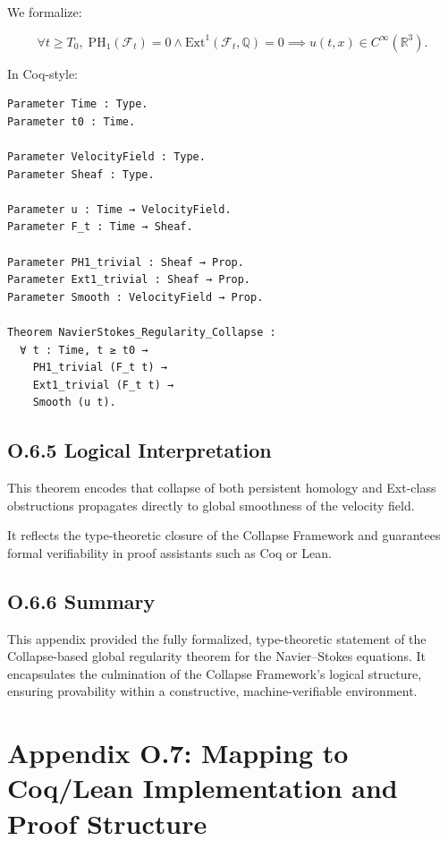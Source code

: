 \documentclass[11pt]{article}
\begin{document}
We formalize:

\[
\forall t \geq T_0,\;
\mathrm{PH}_1(\mathcal{F}_t) = 0 \land \mathrm{Ext}^1(\mathcal{F}_t, \mathbb{Q}) = 0
\implies u(t, x) \in C^\infty(\mathbb{R}^3).
\]

In Coq-style:

\begin{lstlisting}[language=Coq]
Parameter Time : Type.
Parameter t0 : Time.

Parameter VelocityField : Type.
Parameter Sheaf : Type.

Parameter u : Time → VelocityField.
Parameter F_t : Time → Sheaf.

Parameter PH1_trivial : Sheaf → Prop.
Parameter Ext1_trivial : Sheaf → Prop.
Parameter Smooth : VelocityField → Prop.

Theorem NavierStokes_Regularity_Collapse :
  ∀ t : Time, t ≥ t0 →
    PH1_trivial (F_t t) →
    Ext1_trivial (F_t t) →
    Smooth (u t).
\end{lstlisting}

\subsection*{O.6.5 Logical Interpretation}

This theorem encodes that collapse of both persistent homology and Ext-class obstructions propagates directly to global smoothness of the velocity field.

It reflects the type-theoretic closure of the Collapse Framework and guarantees formal verifiability in proof assistants such as Coq or Lean.

\subsection*{O.6.6 Summary}

This appendix provided the fully formalized, type-theoretic statement of the Collapse-based global regularity theorem for the Navier–Stokes equations.  
It encapsulates the culmination of the Collapse Framework's logical structure, ensuring provability within a constructive, machine-verifiable environment.



\section*{Appendix O.7: Mapping to Coq/Lean Implementation and Proof Structure}
\end{document}
